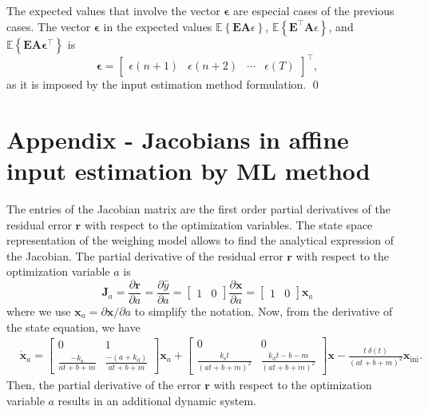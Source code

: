 \begin{pf}
The expected values that involve the vector $\bm{\epsilon}$ are especial cases of the previous cases. 
The vector $\bm{\epsilon}$ in the expected values $\mathbb{E} \left\{ \mathbf{E} \mathbf{A} \epsilon \right\}$, $\mathbb{E} \left\{ \mathbf{E}^\top \mathbf{A} \epsilon \right\}$, and $\mathbb{E} \left\{ \mathbf{E} \mathbf{A} \bm{\epsilon}^\top \right\}$ is
\begin{equation} \bm{\epsilon} = \begin{bmatrix} \epsilon(n+1) & \epsilon(n+2) & \cdots & \epsilon(T) \end{bmatrix}^\top, \end{equation}
as it is imposed by the input estimation method formulation.
\qed \end{pf}


\section{Appendix - Jacobians in affine input estimation by ML method \label{appendix:Jacobians} }

The entries of the Jacobian matrix are the first order partial derivatives of the residual error $\mathbf{r}$ with respect to the optimization variables.
The state space representation of the weighing model allows to find the analytical expression of the Jacobian.
The partial derivative of the residual error $\mathbf{r}$ with respect to the optimization variable $a$ is 
\begin{equation} \mathbf{J}_a=\dfrac{\partial \mathbf{r}}{\partial a} = \dfrac{\partial \widehat{y}}{\partial a} = \begin{bmatrix} 1 & 0  \end{bmatrix} \dfrac{\partial \mathbf{x}}{\partial a} = \begin{bmatrix} 1 & 0  \end{bmatrix} \mathbf{x}_a \end{equation}
where we use $\mathbf{x}_a = \partial \mathbf{x}/ \partial a$ to simplify the notation. 
Now, from the derivative of the state equation, we have
\begin{equation} \begin{aligned} 
    & \dot{\mathbf{x}}_a = \begin{bmatrix} 0 & 1 \\ \frac{-k_{\mathrm{s}}}{a t + b + m} & \frac{-(a + k_{\mathrm{d}})}{a t + b + m} \end{bmatrix} \mathbf{x}_a 
    + \begin{bmatrix} 0 & 0 \\ \frac{k_{\mathrm{s}} t}{(a t + b + m)^2} & \frac{k_{\mathrm{d}} t - b - m}{(a t + b + m)^2} \end{bmatrix} \mathbf{x} 
    - \frac{t \ \delta(t)}{(a t + b + m)^2} \mathbf{x}_{\text{ini}}   . 
\end{aligned} \end{equation}
Then, the partial derivative of the error $\mathbf{r}$ with respect to the optimization variable $a$ results in an additional dynamic system.

